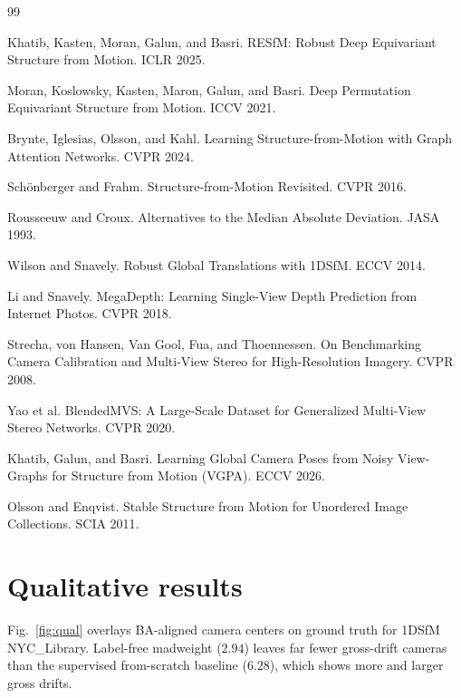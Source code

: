 \documentclass{article}
\newcommand{\mad}{madweight}
\begin{document}
\label{sec:endcontent}%
\begin{thebibliography}{99}\small

 Khatib, Kasten, Moran, Galun, and Basri. RESfM: Robust Deep Equivariant Structure from Motion. ICLR 2025.

 Moran, Koslowsky, Kasten, Maron, Galun, and Basri. Deep Permutation Equivariant Structure from Motion. ICCV 2021.

 Brynte, Iglesias, Olsson, and Kahl. Learning Structure-from-Motion with Graph Attention Networks. CVPR 2024.

 Sch\"onberger and Frahm. Structure-from-Motion Revisited. CVPR 2016.

 Rousseeuw and Croux. Alternatives to the Median Absolute Deviation. JASA 1993.

 Wilson and Snavely. Robust Global Translations with 1DSfM. ECCV 2014.

 Li and Snavely. MegaDepth: Learning Single-View Depth Prediction from Internet Photos. CVPR 2018.

 Strecha, von Hansen, Van Gool, Fua, and Thoennessen. On Benchmarking Camera Calibration and Multi-View Stereo for High-Resolution Imagery. CVPR 2008.

 Yao et al. BlendedMVS: A Large-Scale Dataset for Generalized Multi-View Stereo Networks. CVPR 2020.

 Khatib, Galun, and Basri. Learning Global Camera Poses from Noisy View-Graphs for Structure from Motion (VGPA). ECCV 2026.

 Olsson and Enqvist. Stable Structure from Motion for Unordered Image Collections. SCIA 2011.

\end{thebibliography}


\appendix
\section{Qualitative results}\label{app:qual}
Fig.~\ref{fig:qual} overlays BA-aligned camera centers on ground truth for 1DSfM
NYC\_Library. Label-free \mad{} ($2.94$) leaves far fewer gross-drift cameras than the
supervised from-scratch baseline ($6.28$), which shows more and larger gross drifts.
\end{document}
